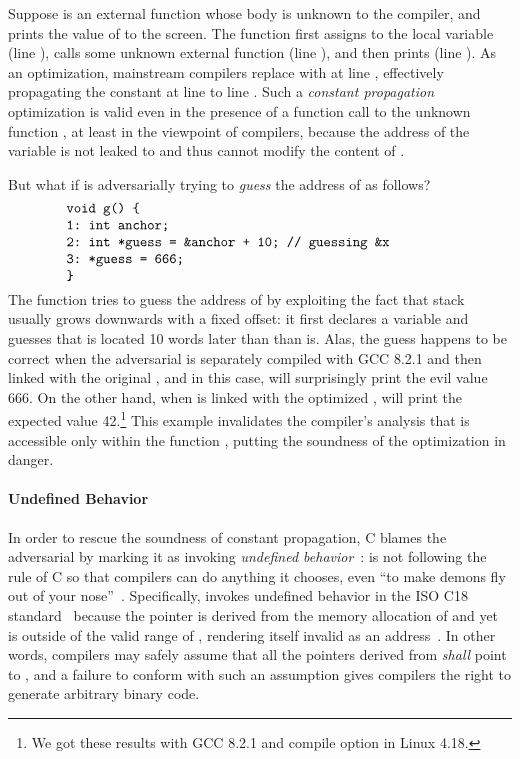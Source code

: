 \noindent Suppose  is an external function whose body is unknown to the compiler, and
 prints the value of  to the screen.  The function  first assigns
 to the local variable  (line ), calls some unknown external function
 (line ), and then prints  (line ).  As an optimization,
mainstream compilers replace  with  at line , effectively propagating the
constant  at line  to line .  Such a \emph{constant propagation}
optimization is valid even in the presence of a function call to the unknown function , at
least in the viewpoint of compilers, because the address of the variable  is not leaked to
 and thus  cannot modify the content of .

But what if  is adversarially trying to \emph{guess} the address of  as follows?
%
\[
\begin{minipage}{0.8\textwidth}
\begin{verbatim}
void g() {
1: int anchor;
2: int *guess = &anchor + 10; // guessing &x
3: *guess = 666;
}
\end{verbatim}
\end{minipage}
\]
%
\noindent The function  tries to guess the address of  by exploiting the fact that
stack usually grows downwards with a fixed offset: it first declares a variable  and
guesses that  is located 10 words later than than  is.  Alas, the guess happens
to be correct when the adversarial  is separately compiled with GCC 8.2.1 and then linked
with the original , and in this case,  will surprisingly print the evil value
666.  On the other hand, when  is linked with the optimized ,  will
print the expected value 42.\footnote{We got these results with GCC 8.2.1 and compile option
   in Linux 4.18.} This example invalidates the compiler's analysis that
 is accessible only within the function , putting the soundness of the
optimization in danger.


\paragraph{Undefined Behavior}

In order to rescue the soundness of constant propagation, C blames the adversarial  by
marking it as invoking \emph{undefined behavior}~\cite[\S3.4.3p1]{c18}:  is not following
the rule of C so that compilers can do anything it chooses, \eg{} even ``to make demons fly out of
your nose''~\cite{nasal-demons}.  Specifically,  invokes undefined behavior in the ISO C18
standard~\cite{c18} because the pointer  is derived from the memory allocation of
 and yet is outside of the valid range of , rendering itself invalid as an
address~\cite[\S6.5.6p8]{c18}.  In other words, compilers may safely assume that all the pointers
derived from  \emph{shall} point to , and a failure to conform with such
an assumption gives compilers the right to generate arbitrary binary code.

